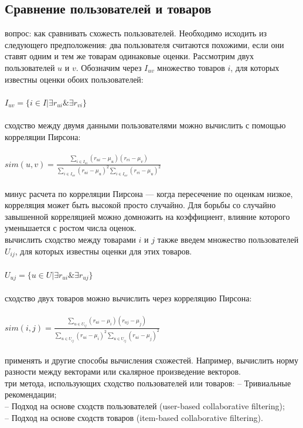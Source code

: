 \documentclass{article}
\newcommand\tab[1][1cm]{\hspace*{#1}}
\begin{document}
\subsection{Сравнение пользователей и товаров}
 вопрос: как сравнивать схожесть пользователей. Необходимо исходить из следующего предположения: два пользователя считаются похожими, если они ставят одним и тем же товарам одинаковые оценки. Рассмотрим двух пользователей ﻿$u$﻿ и ﻿$v$﻿. Обозначим через ﻿$I_{uv}$ множество товаров ﻿$i$, для которых известны оценки обоих пользователей:\\
\\
\tab$I_{uv}=\{ i\in I | \exists r_{ui} \& \exists r_{vi}\}$\\
\\
 сходство между двумя данными пользователями можно вычислить с помощью корреляции Пирсона:\\
\\
\tab$sim(u,v)=\frac{\sum_{i\in I_{ui}}{(r_{ui}-\mu_u)(r_{vi}-\mu_v)}}{\sum_{i\in I_{uv}}{(r_{ui}-\mu_u)^2}\sum_{i\in I_{uv}}{(r_{vi}-\mu_u)^2}}$\\
\\
 минус расчета по корреляции Пирсона — когда пересечение по оценкам низкое, корреляция может быть высокой просто случайно. Для борьбы со случайно завышенной корреляцией можно домножить на коэффициент, влияние которого уменьшается с ростом числа оценок.\\
 вычислить сходство между товарами $i$﻿ и ﻿$j$﻿ также введем множество пользователей ﻿$U_{ij}$﻿, для которых известны оценки для этих товаров.\\
\\
\tab$U_{uj}=\{u\in U|\exists r_{ui} \&\exists r_{uj}\}$\\
\\
 сходство двух товаров можно вычислить через корреляцию Пирсона:\\
\\
\tab$sim(i,j)=\frac{\sum_{u\in U_{ij}}{(r_{ui}-\mu_i)(r_{uj}-\mu_j)}}{\sum_{u\in U_{ij}}{(r_{ui}-\mu_i)^2}\sum_{u\in U_{ij}}{(r_{ui}-\mu_j)^2}}$\\
\\
 применять и другие способы вычисления схожестей. Например, вычислить норму разности между векторами или скалярное произведение векторов.\\
 три метода, использующих сходство пользователей или товаров:
\tab– Тривиальные рекомендации;\\
\tab– Подход на основе сходств пользователей (user-based collaborative filtering);\\
\tab– Подход на основе сходств товаров (item-based collaborative filtering).
\end{document}
